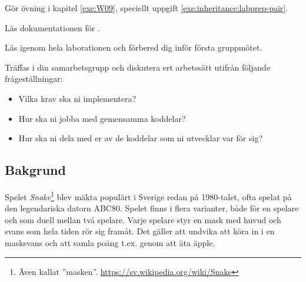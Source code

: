 
\Teamlab{\LabWeekTEN}

\begin{Goals}

\end{Goals}

\begin{Preparations}
\item Gör övning {\tt \ExeWeekNINE} i kapitel \ref{exe:W09}, speciellt uppgift \ref{exe:inheritance:labprep-pair}.
\item Läs dokumentationen för .
\item Läs igenom hela laborationen och förbered dig inför första gruppmötet.

\item Träffas i din samarbetsgrupp och diskutera ert arbetssätt utifrån följande frågeställningar:
\begin{itemize}[nolistsep]
  \item Vilka krav ska ni implementera?
  \item Hur ska ni jobba med gemensamma koddelar?
  \item Hur ska ni dela med er av de koddelar som ni utvecklar var för sig?
\end{itemize}

\end{Preparations}

\subsection{Bakgrund}

Spelet \emph{Snake}\footnote{Även kallat ''masken''. \url{https://sv.wikipedia.org/wiki/Snake}} blev mäkta populärt i Sverige redan på 1980-talet, ofta spelat på den legendariska datorn ABC80. Spelet finns i flera varianter, både för en spelare och som duell mellan två spelare. Varje spelare styr en mask med huvud och svans som hela tiden rör sig framåt. Det gäller att undvika att köra in i en masksvans och att samla poäng t.ex. genom att äta äpple.

